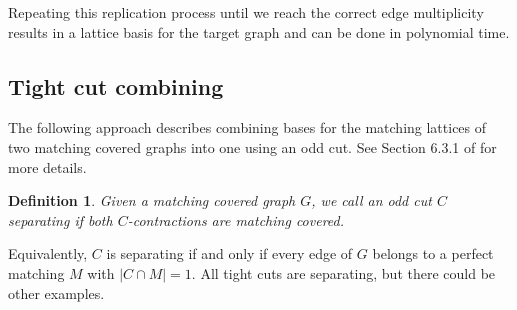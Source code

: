 \documentclass[11pt]{article}
\newcommand{\1}{\mathbf{1}}
\newcommand{\0}{\mathbf{0}}
\newtheorem{DE}[theorem]{Definition}
\begin{document}
Repeating this replication process until we reach the correct edge multiplicity results in a lattice basis for the target graph and can be done in polynomial time.

\subsection{Tight cut combining}\label{sec:basis-comb}
The following approach describes combining bases for the matching lattices of two matching covered graphs into one using an odd cut. See Section 6.3.1 of \cite{Lucchesi2024} for more details.
\begin{DE}
    Given a matching covered graph $G$, we call an odd cut $C$ \emph{separating} if both $C$-contractions are matching covered.
\end{DE} Equivalently, $C$ is separating if and only if every edge of $G$ belongs to a perfect matching $M$ with $|C\cap M|=1$. All tight cuts are separating, but there could be other examples. 
\end{document}
